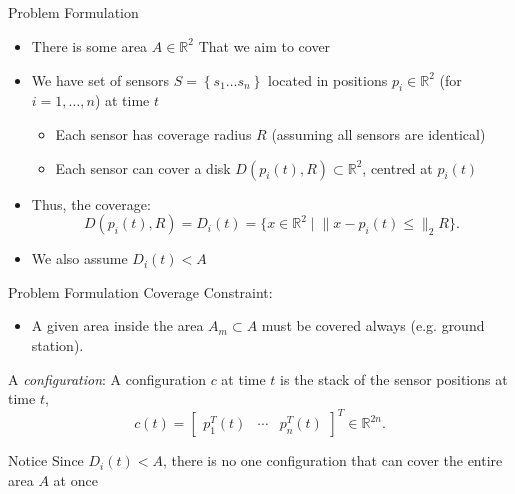 \documentclass[t]{beamer}
\newcommand{\rR}{\mathbb{R}}
\newcommand{\rsqr}{\mathbb{R}^2}
\newcommand{\bmat}[1]{\begin{bmatrix}#1\end{bmatrix}}
\newcommand{\norm}[1]{\lVert #1 \rVert}
\begin{document}
\subsection[Problem Formulation]{}
\begin{frame}[label=formulation]{Problem Formulation}
\begin{itemize}
\item There is some area $A \in \rR^{2}$ That we aim to cover
\item We have set of sensors $S = \left\{s_1 \ldots s_n\right\}$ located in positions $p_i \in \mathbb{R}^2$ (for $i=1,\ldots,n$) at time $t$
\begin{itemize}
\item Each sensor has coverage radius $R$ (assuming all sensors are identical)
\item Each sensor can cover a disk $D\left(p_{i}\left(t\right), R\right)\subset \rsqr$, centred at $p_{i} \left( t \right)$
\end{itemize}
\item Thus, the coverage: \begin{equation}
D\left(p_{i}\left(t\right),R\right) = D_{i}\left(t\right) = \{ x\in\rsqr \mid \lVert x - p_{i}\left(t\right) \leq \rVert_{2} R \}.
\end{equation}
\item We also assume $D_{i}\left(t\right) < A$
\end{itemize}
\end{frame}

\begin{frame}[label=formulation2]{Problem Formulation}
Coverage Constraint:
\begin{itemize}
\item A given area inside the area $A_{m} \subset A$ must be covered always (e.g. ground station).
\end{itemize}
A \emph{configuration}: A configuration $c$ at time $t$ is the stack of the sensor positions at time $t$,
\begin{equation}
c\left(t\right) = \bmat{
p_{1}^{T}\left(t\right)&\cdots&p_{n}^{T}\left(t\right)}^{T}\in\mathbb{R}^{2n}.
\end{equation}
\begin{alertblock}{Notice}
Since $D_{i}\left( t \right) < A$, there is no one configuration that can cover the entire area $A$ at once
\end{alertblock}
\end{frame}
\end{document}
